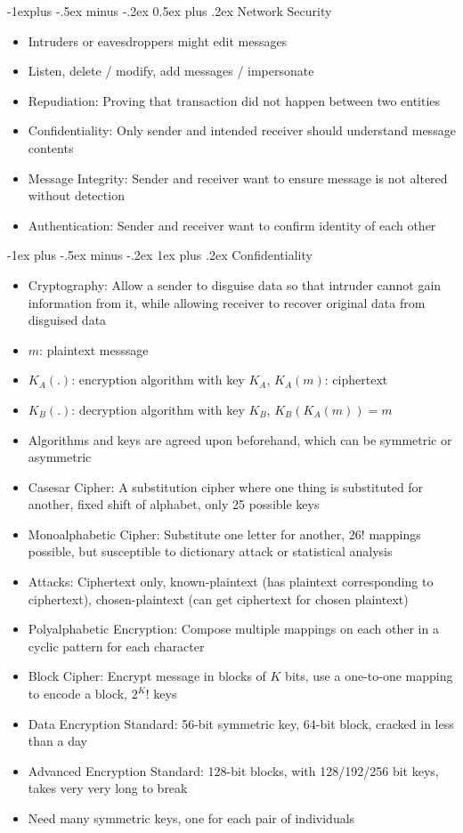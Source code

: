 \documentclass[10pt, landscape]{article}
\makeatletter
\renewcommand{\section}{\@startsection{section}{1}{0mm}%
                                {-1ex plus -.5ex minus -.2ex}%
                                {0.5ex plus .2ex}%
                                {\normalfont\large\bfseries}}
\renewcommand{\section}{\@startsection{section}{2}{0mm}%
                                {-1explus -.5ex minus -.2ex}%
                                {0.5ex plus .2ex}%
                                {\normalfont\normalsize\bfseries}}
\renewcommand{\subsection}{\@startsection{subsection}{3}{0mm}%
                                {-1ex plus -.5ex minus -.2ex}%
                                {1ex plus .2ex}%
                                {\normalfont\small\bfseries}}%
\makeatother
\begin{document}
\begin{multicols*}{3}
\section{Network Security}
\begin{itemize}
    \item Intruders or eavesdroppers might edit messages
    \item Listen, delete / modify, add messages / impersonate
    \item Repudiation: Proving that transaction did not happen between two entities
    \item Confidentiality: Only sender and intended receiver should understand message contents
    \item Message Integrity: Sender and receiver want to ensure message is not altered without detection
    \item Authentication: Sender and receiver want to confirm identity of each other
\end{itemize}
\subsection{Confidentiality}
\begin{itemize}
    \item Cryptography: Allow a sender to disguise data so that intruder cannot gain information from it, while allowing receiver to recover original data from disguised data
    \item $m$: plaintext messsage
    \item $K_A(.)$: encryption algorithm with key $K_A$, $K_A(m)$: ciphertext
    \item $K_B(.)$: decryption algorithm with key $K_B$, $K_B(K_A(m))=m$
    \item Algorithms and keys are agreed upon beforehand, which can be symmetric or asymmetric
    \item Casesar Cipher: A substitution cipher where one thing is substituted for another, fixed shift of alphabet, only 25 possible keys
    \item Monoalphabetic Cipher: Substitute one letter for another, $26!$ mappings possible, but susceptible to dictionary attack or statistical analysis
    \item Attacks: Ciphertext only, known-plaintext (has plaintext corresponding to ciphertext), chosen-plaintext (can get ciphertext for chosen plaintext)
    \item Polyalphabetic Encryption: Compose multiple mappings on each other in a cyclic pattern for each character
    \item Block Cipher: Encrypt message in blocks of $K$ bits, use a one-to-one mapping to encode a block, $2^K!$ keys
    \item Data Encryption Standard: 56-bit symmetric key, 64-bit block, cracked in less than a day
    \item Advanced Encryption Standard: 128-bit blocks, with 128/192/256 bit keys, takes very very long to break
    \item Need many symmetric keys, one for each pair of individuals
\end{itemize}

\end{multicols*}
\end{document}
